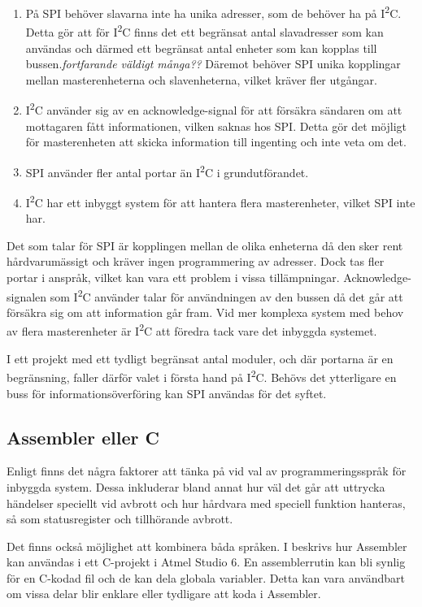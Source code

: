 \documentclass[11pt]{article}
\begin{document}
\begin{flushleft}
\begin{enumerate}
	\item På SPI behöver slavarna inte ha unika adresser, som de behöver ha på I\textsuperscript{2}C. Detta gör att för I\textsuperscript{2}C finns det ett begränsat antal slavadresser som kan användas och därmed ett begränsat antal enheter som kan kopplas till bussen.\textit{fortfarande väldigt många??} Däremot behöver SPI unika kopplingar mellan masterenheterna och slavenheterna, vilket kräver fler utgångar.
	\item I\textsuperscript{2}C använder sig av en acknowledge-signal för att försäkra sändaren om att mottagaren fått informationen, vilken saknas hos SPI. Detta gör det möjligt för masterenheten att skicka information till ingenting och inte veta om det. 
	\item SPI använder fler antal portar än I\textsuperscript{2}C i grundutförandet.
	\item I\textsuperscript{2}C har ett inbyggt system för att hantera flera masterenheter, vilket SPI inte har.
\end{enumerate}

Det som talar för SPI är kopplingen mellan de olika enheterna då den sker rent hårdvarumässigt och kräver ingen programmering av adresser. Dock tas fler portar i anspråk, vilket kan vara ett problem i vissa tillämpningar. Acknowledge-signalen som I\textsuperscript{2}C använder talar för användningen av den bussen då det går att försäkra sig om att information går fram. Vid mer komplexa system med behov av flera masterenheter är I\textsuperscript{2}C att föredra tack vare det inbyggda systemet. 

I ett projekt med ett tydligt begränsat antal moduler, och där portarna är en begränsning, faller därför valet i första hand på I\textsuperscript{2}C. Behövs det ytterligare en buss för informationsöverföring kan SPI användas för det syftet.

\subsection{Assembler eller C}

Enligt \cite{CPC} finns det några faktorer att tänka på vid val av programmeringsspråk för inbyggda system. Dessa inkluderar bland annat hur väl det går att uttrycka händelser speciellt vid avbrott och hur hårdvara med speciell funktion hanteras, så som statusregister och tillhörande avbrott.  

Det finns också möjlighet att kombinera båda språken. I \cite{AssC} beskrivs hur Assembler kan användas i ett C-projekt i Atmel Studio 6. En assemblerrutin kan bli synlig för en C-kodad fil och de kan dela globala variabler. Detta kan vara användbart om vissa delar blir enklare eller tydligare att koda i Assembler.


\end{flushleft}
\end{document}
